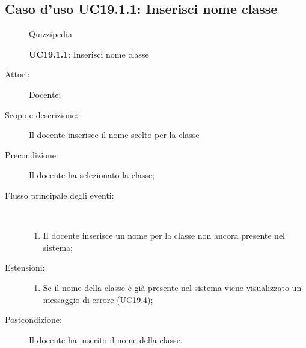 \subsection{Caso d'uso UC19.1.1: Inserisci nome classe}
\begin{figure}[H]
	\centering
	\begin{resizedtikzpicture}{\textwidth}
		\begin{umlsystem}[x=0, fill=lightgray!20]{Quizzipedia}
		\end{umlsystem}
	\end{resizedtikzpicture}
	\caption{\textbf{UC19.1.1}: Inserisci nome classe}
	\label{UC19.1.1}
\end{figure}
\begin{description}
	\item[Attori:] Docente;
	\item[Scopo e descrizione:] Il docente inserisce il nome scelto per la classe
	\item[Precondizione:] Il docente ha selezionato la classe;
	
	\item[Flusso principale degli eventi:] \ 
	\begin{enumerate}
		\item Il docente inserisce un nome per la classe non ancora presente nel sistema;
		
	\end{enumerate}
	\item[Estensioni:]
	\begin{enumerate}
		\item Se il nome della classe è già presente nel sistema viene visualizzato un messaggio di errore (\hyperlink{UC19.4}{UC19.4});
		
	\end{enumerate}
	\item[Postcondizione:] Il docente ha inserito il nome della classe.
\end{description}
\hypertarget{UC19.1.2}{}
